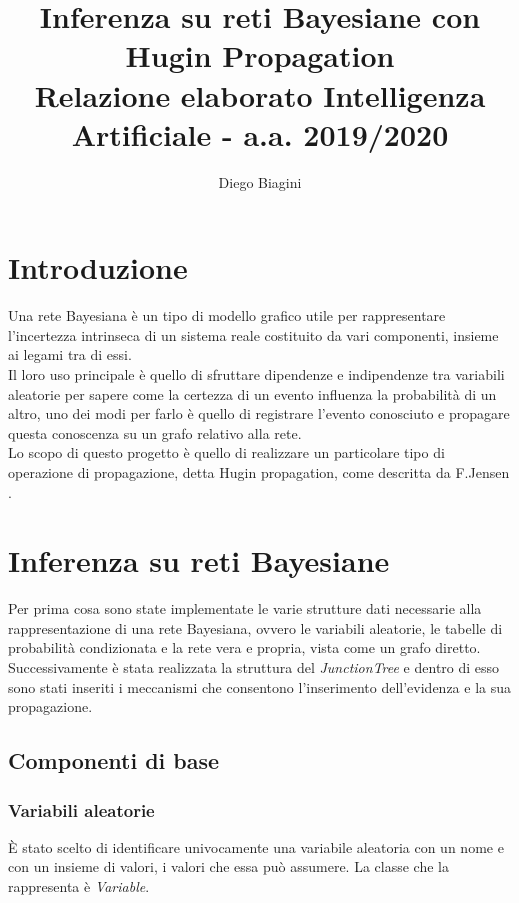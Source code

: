 \documentclass[a4paper]{article}
\title{%
  Inferenza su reti Bayesiane con Hugin Propagation \\
  \large Relazione elaborato Intelligenza Artificiale - a.a. 2019/2020}
\author{Diego Biagini}
\date{}
\begin{document}
\maketitle


\section{Introduzione}
Una rete Bayesiana è un tipo di modello grafico utile per rappresentare l'incertezza intrinseca di un sistema reale costituito da vari componenti, insieme ai legami tra di essi.\\
Il loro uso principale è quello di sfruttare dipendenze e indipendenze tra variabili aleatorie per sapere come la certezza di un evento influenza la probabilità di un altro, uno dei modi per farlo è quello di registrare l'evento conosciuto e propagare questa conoscenza su un grafo relativo alla rete.\\
Lo scopo di questo progetto è quello di realizzare un particolare tipo di operazione di propagazione, detta Hugin propagation, come descritta da F.Jensen \autocite{jensen_bnet}.
\section{Inferenza su reti Bayesiane}
Per prima cosa sono state implementate le varie strutture dati necessarie alla rappresentazione di una rete Bayesiana, ovvero le variabili aleatorie, le tabelle di probabilità condizionata e la rete vera e propria, vista come un grafo diretto.\\
Successivamente è stata realizzata la struttura del \emph{JunctionTree} e dentro di esso sono stati inseriti i meccanismi che consentono l'inserimento dell'evidenza e la sua propagazione.
\subsection{Componenti di base}
\subsubsection{Variabili aleatorie}
È stato scelto di identificare univocamente una variabile aleatoria con un nome e con un insieme di valori, i valori che essa può assumere. La classe che la rappresenta è  \emph{Variable}.
\end{document}
